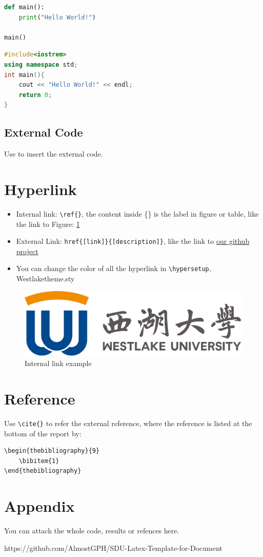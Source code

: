 \documentclass{article}
\begin{document}
\begin{lstlisting}[language=python,title=python]
def main():
    print("Hello World!")

main()
\end{lstlisting}

\begin{lstlisting}[language=C++,title=C++]
#include<iostrem>
using namespace std;
int main(){
    cout << "Hello World!" << endl;
    return 0;
}
\end{lstlisting}
\subsection{External Code}
Use \verb|| to insert the external code.


\newpage
\section{Hyperlink}

\begin{itemize}
    \item Internal link: \verb|\ref{}|, the content inside \{\} is the label in figure or table, like the link to Figure: \ref{fig:logo}
    \item External Link: \verb|href{[link]}{[description]}|, like the link to \href{https://github.com/52liyitong/Westlake-beamer}{our github project}
    \item You can change the color of all the hyperlink in \verb|\hypersetup|, Westlaketheme.sty
\end{itemize}

\begin{figure}[!h]
    \centering
    \includegraphics[width=0.5\linewidth]{logo.png}
    \caption{Internal link example}
    \label{fig:logo}
\end{figure}
\section{Reference}

Use \verb|\cite{}| to refer the external reference, where the reference is listed at the bottom of the report by:
\begin{lstlisting}[title=Reference List]
\begin{thebibliography}{9}
    \bibitem{1}
\end{thebibliography}
\end{lstlisting}

\newpage

\section*{Appendix}
You can attach the whole code, results or refences here.

\begin{thebibliography}{9}
     https://github.com/AlmostGPH/SDU-Latex-Template-for-Document
\end{thebibliography}
\end{document}
